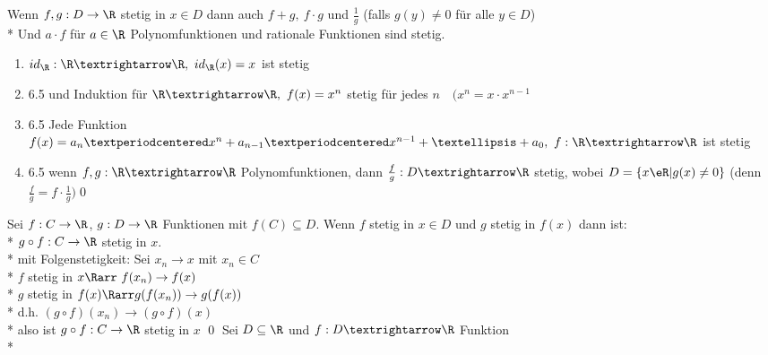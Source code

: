 %
\wdh
{}
Wenn $f, g: D \to \R$ stetig in $x \in D$ dann auch $f + g,\ f · g$ und $\frac{1}{g}$ (falls $g(y) \neq 0$ für alle $y \in D$) \\*
Und $a \cdot f$ für $a \in \R$
Polynomfunktionen und rationale Funktionen sind stetig.
\bew
\begin{enumerate}
\item{$id_{\R}:\R→\R,\ id_{\R}(x)=x$ ist stetig}
\item{6.5 und Induktion \Rarr{} für $\R→\R,\ f(x)=x^n$ stetig für jedes $n\quad (x^n=x·x^{n-1}$}
\item{6.5 \Rarr{} Jede Funktion $f(x)=a_n·x^{n}+a_{n-1}·x^{n-1}+…+a_0,\ f:\R→\R$ ist stetig}
\item{6.5 \Rarr{} wenn $f,g:\R→\R$ Polynomfunktionen, dann $\frac{f}{g}:D→\R$ stetig, wobei $D=\{x\eR|g(x)\neq 0\}$ (denn $\frac{f}{g}=f·\frac{1}{g})$\qed}
\end{enumerate}
Sei $f: C \to \R$, $g: D \to \R$ Funktionen mit $f(C) \subseteq D$. Wenn $f$ stetig in $x \in D$ und $g$ stetig in $f(x)$ dann ist:\\*
$g \circ f: C \to \R$ stetig in $x$.\\*
\bew mit Folgenstetigkeit:
Sei $x_n \to x$ mit $x_n \in C$\\*
$f$ stetig in $x \Rarr \ f(x_n) \to f(x)$\\*
$g$ stetig in $f(x) \Rarr g(f(x_n)) \to g(f(x))$\\*
d.h. $(g \circ f)(x_n) \to (g \circ f)(x)$\\*
also ist $g \circ f: C \to \R$ stetig in $x$ \qed
{}
Sei $D\subseteq\R$ und $f:D→\R$ Funktion\\*
